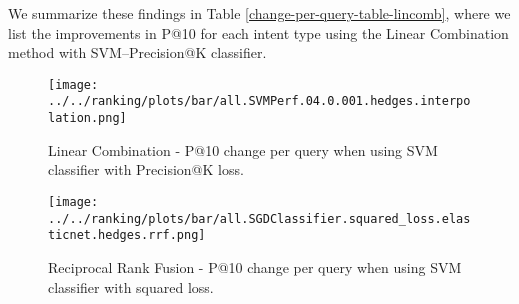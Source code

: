 We summarize these findings in Table \ref{change-per-query-table-lincomb},
where we list the improvements in P@10 for each intent type using the Linear Combination method with SVM--Precision@K
classifier.

\begin{table}
\centering
\caption{Absolute P@10 percent improvements per intent type for each of the four query runs
(Summaries 2014, Descriptions 2014, Summaries 2015, Descriptions 2015), when using weighted \textbf{Linear Combination}
for fusing the baseline relevance scores with the classifier scores.
The classifier is SVM with Precision@K loss.}
\label{change-per-query-table-lincomb}
\end{table}

\begin{figure}
\centerline{
  \texttt{[image: ../../ranking/plots/bar/all.SVMPerf.04.0.001.hedges.interpolation.png]}
  }
  \caption{Linear Combination - P@10 change per query when using SVM classifier with Precision@K loss.}
  \label{interp-query}
\end{figure}

\begin{figure}
\centerline{
  \texttt{[image: ../../ranking/plots/bar/all.SGDClassifier.squared\_loss.elasticnet.hedges.rrf.png]}
  }
  \caption{Reciprocal Rank Fusion - P@10 change per query when using SVM classifier with squared loss.}
  \label{rrf-query}
\end{figure}


